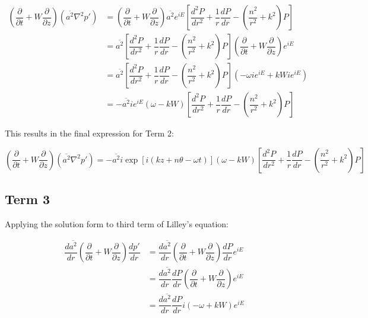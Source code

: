 \documentclass[]{aiaa-tc}%
\begin{document}
\begin{align*}
\left( \dfrac{\partial}{\partial t}
  + W \dfrac{\partial}{\partial z} \right)
  (\overline{a^2}\nabla^2p')
&= \left( \dfrac{\partial}{\partial t}
  + W \dfrac{\partial}{\partial z}
  \right) \overline{a^2} e^{iE} \left[
      \dfrac{d^2P}{dr^2}
    + \dfrac{1}{r} \dfrac{dP}{dr}
    - \left( \dfrac{n^2}{r^2} + k^2 \right) P \right] \\
&= \overline{a^2} \left[ \dfrac{d^2P}{dr^2}
          + \dfrac{1}{r} \dfrac{dP}{dr}
          - \left( \dfrac{n^2}{r^2} + k^2 \right) P \right]
    \left( \dfrac{\partial}{\partial t}
  + W \dfrac{\partial}{\partial z}
  \right) e^{iE} \\
&= \overline{a^2} \left[ \dfrac{d^2P}{dr^2}
          + \dfrac{1}{r} \dfrac{dP}{dr}
          - \left( \dfrac{n^2}{r^2} + k^2 \right) P \right]
  \left( -\omega ie^{iE} + kW ie^{iE}\right) \\
&= - \overline{a^2} ie^{iE} (\omega - kW) \left[ \dfrac{d^2P}{dr^2}
          + \dfrac{1}{r} \dfrac{dP}{dr}
          - \left( \dfrac{n^2}{r^2} + k^2 \right) P \right]
\end{align*}

This results in the final expression for Term 2:

\begin{equation} \label{term2soln}
\boxed{ \left( \dfrac{\partial}{\partial t}
  + W \dfrac{\partial}{\partial z} \right)
  (\overline{a^2}\nabla^2p')
= - \overline{a^2} i\exp[i(kz + n\theta -\omega t)]
    (\omega - kW) \left[ \dfrac{d^2P}{dr^2}
    + \dfrac{1}{r} \dfrac{dP}{dr}
    - \left( \dfrac{n^2}{r^2} + k^2 \right) P \right] }
\end{equation}





\clearpage
\subsection{Term 3}

Applying the solution form to third term of Lilley's equation:

\begin{align*}
\dfrac{d \overline{a^2}}{dr} \left( \dfrac{\partial}{\partial t} + W \dfrac{\partial}{\partial z} \right) \dfrac{dp'}{dr}
&= \dfrac{d \overline{a^2}}{dr}
   \left( \dfrac{\partial}{\partial t} + W \dfrac{\partial}{\partial z} \right)
   \dfrac{dP}{dr} e^{iE}  \\
&= \dfrac{d \overline{a^2}}{dr} \dfrac{dP}{dr}
   \left( \dfrac{\partial}{\partial t} + W \dfrac{\partial}{\partial z} \right) e^{iE} \\
&= \dfrac{d \overline{a^2}}{dr} \dfrac{dP}{dr}
    i(-\omega + kW) e^{iE}
\end{align*}
\end{document}
